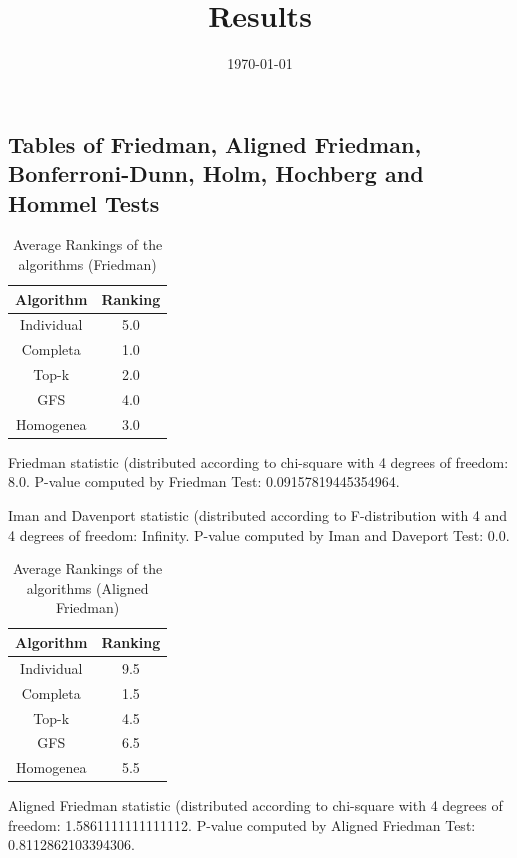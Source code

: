 \documentclass[a4paper,10pt]{article}
\title{Results}
\author{}
\date{\today}
\begin{document}
\begin{landscape}
\oddsidemargin 0in \topmargin 0in\maketitle
\section{Tables of Friedman, Aligned Friedman, Bonferroni-Dunn, Holm, Hochberg and Hommel Tests}
\begin{table}[!htp]
\centering
\caption{Average Rankings of the algorithms (Friedman)
}\begin{tabular}{c|c}
Algorithm&Ranking\\
\hline
Individual&5.0\\
Completa&1.0\\
Top-k&2.0\\
GFS&4.0\\
Homogenea&3.0\\
\end{tabular}
\end{table}


Friedman statistic (distributed according to chi-square with 4 degrees of freedom: 8.0. 
P-value computed by Friedman Test: 0.09157819445354964.\newline

Iman and Davenport statistic (distributed according to F-distribution with 4 and 4 degrees of freedom: Infinity. 
P-value computed by Iman and Daveport Test: 0.0.\newline


\newpage

\begin{table}[!htp]
\centering
\caption{Average Rankings of the algorithms (Aligned Friedman)
}\begin{tabular}{c|c}
Algorithm&Ranking\\
\hline
Individual&9.5\\
Completa&1.5\\
Top-k&4.5\\
GFS&6.5\\
Homogenea&5.5\\
\end{tabular}
\end{table}


Aligned Friedman statistic (distributed according to chi-square with 4 degrees of freedom: 1.5861111111111112. 
P-value computed by Aligned Friedman Test: 0.8112862103394306.\newline



\end{landscape}
\end{document}
